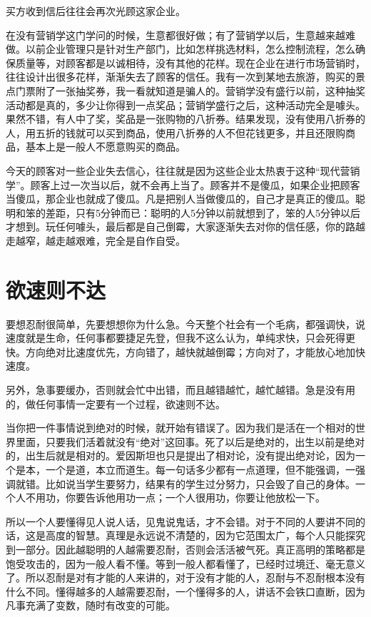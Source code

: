 \documentclass[fontset=fandol, a4paper, 12pt, openright]{ctexbook}
\begin{document}
买方收到信后往往会再次光顾这家企业。

在没有营销学这门学问的时候，生意都很好做；有了营销学以后，生意越来越难做。以前企业管理只是针对生产部门，比如怎样挑选材料，怎么控制流程，怎么确保质量等，对顾客都是以诚相待，没有其他的花样。现在企业在进行市场营销时，往往设计出很多花样，渐渐失去了顾客的信任。我有一次到某地去旅游，购买的景点门票附了一张抽奖券，我一看就知道是骗人的。营销学没有盛行以前，这种抽奖活动都是真的，多少让你得到一点奖品；营销学盛行之后，这种活动完全是噱头。果然不错，有人中了奖，奖品是一张购物的八折券。结果发现，没有使用八折券的人，用五折的钱就可以买到商品，使用八折券的人不但花钱更多，并且还限购商品，基本上是一般人不愿意购买的商品。

今天的顾客对一些企业失去信心，往往就是因为这些企业太热衷于这种“现代营销学”。顾客上过一次当以后，就不会再上当了。顾客并不是傻瓜，如果企业把顾客当傻瓜，那企业也就成了傻瓜。凡是把别人当做傻瓜的，自己才是真正的傻瓜。聪明和笨的差距，只有5分钟而已：聪明的人5分钟以前就想到了，笨的人5分钟以后才想到。玩任何噱头，最后都是自己倒霉，大家逐渐失去对你的信任感，你的路越走越窄，越走越艰难，完全是自作自受。

\section{欲速则不达}

要想忍耐很简单，先要想想你为什么急。今天整个社会有一个毛病，都强调快，说速度就是生命，任何事都要捷足先登，但我不这么认为，单纯求快，只会死得更快。方向绝对比速度优先，方向错了，越快就越倒霉；方向对了，才能放心地加快速度。

另外，急事要缓办，否则就会忙中出错，而且越错越忙，越忙越错。急是没有用的，做任何事情一定要有一个过程，欲速则不达。

当你把一件事情说到绝对的时候，就开始有错误了。因为我们是活在一个相对的世界里面，只要我们活着就没有“绝对”这回事。死了以后是绝对的，出生以前是绝对的，出生后就是相对的。爱因斯坦也只是提出了相对论，没有提出绝对论，因为一个是本，一个是道，本立而道生。每一句话多少都有一点道理，但不能强调，一强调就错。比如说当学生要努力，结果有的学生过分努力，只会毁了自己的身体。一个人不用功，你要告诉他用功一点；一个人很用功，你要让他放松一下。

所以一个人要懂得见人说人话，见鬼说鬼话，才不会错。对于不同的人要讲不同的话，这是高度的智慧。真理是永远说不清楚的，因为它范围太广，每个人只能探究到一部分。因此越聪明的人越需要忍耐，否则会活活被气死。真正高明的策略都是饱受攻击的，因为一般人看不懂。等到一般人都看懂了，已经时过境迁、毫无意义了。所以忍耐是对有才能的人来讲的，对于没有才能的人，忍耐与不忍耐根本没有什么不同。懂得越多的人越需要忍耐，一个懂得多的人，讲话不会铁口直断，因为凡事充满了变数，随时有改变的可能。
\end{document}
